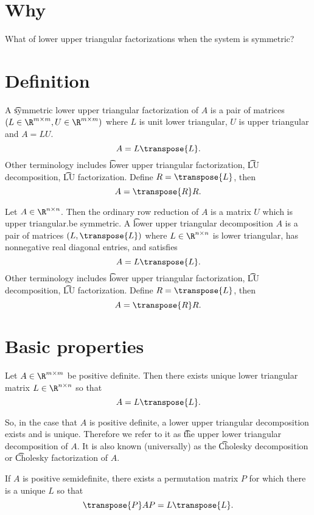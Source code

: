 

\section*{Why}

What of lower upper triangular factorizations when the system is symmetric?

\section*{Definition}

A \t{symmetric lower upper triangular factorization} of $A$ is a pair of matrices $(L \in \R ^{m \times m}, U \in \R ^{m \times m})$ where $L$ is unit lower triangular, $U$ is upper triangular and $A = LU$.
\[
A = L\transpose{L}.
\]
Other terminology includes \t{lower upper triangular factorization}, \t{LU decomposition}, \t{LU factorization}.
Define $R = \transpose{L}$, then
\[
A = \transpose{R}R.
\]

Let $A \in \R ^{n \times  n}$.
Then the ordinary row reduction of $A$ is a matrix $U$ which is upper triangular.be symmetric.
A \t{lower upper triangular decomposition}
$A$ is a pair of matrices $(L, \transpose{L})$ where $L \in \R ^{n \times n}$ is lower triangular, has nonnegative real diagonal entries, and satisfies
\[
A = L\transpose{L}.
\]
Other terminology includes \t{lower upper triangular factorization}, \t{LU decomposition}, \t{LU factorization}.
Define $R = \transpose{L}$, then
\[
A = \transpose{R}R.
\]

\section*{Basic properties}

\begin{proposition}
Let $A \in \R ^{m \times m}$ be positive definite. Then there exists unique lower triangular matrix $L \in \R ^{n \times n}$ so that
\[
A = L\transpose{L}.
\]
\end{proposition}

So, in the case that $A$ is positive definite, a lower upper triangular decomposition exists and is unique.
Therefore we refer to it as \t{the upper lower triangular decomposition} of $A$.
It is also known (universally) as the \t{Cholesky decomposition} or \t{Cholesky factorization} of $A$.

\begin{proposition}
If $A$ is positive semidefinite, there exists a permutation matrix $P$ for which there is a unique $L$ so that
\[
\transpose{P}AP = L\transpose{L}.
\]
\end{proposition}

